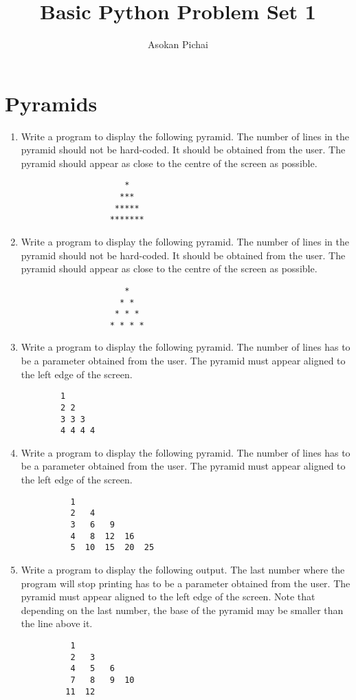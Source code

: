 \documentclass[11pt]{article}
\title{Basic Python Problem Set 1}
\author{Asokan Pichai}
\date{}
\begin{document}
\maketitle
\section{Pyramids}
\begin{enumerate}
    \item Write a program to display the following pyramid. The number of lines in the pyramid should not be hard-coded.
        It should be obtained from the user.  The pyramid should appear as close to the centre of the screen as possible.
        \begin{verbatim}
                     *
                    ***
                   *****
                  *******
        \end{verbatim}
    \item Write a program to display the following pyramid. The number of lines in the pyramid should not be hard-coded.
        It should be obtained from the user.  The pyramid should appear as close to the centre of the screen as possible.
        \begin{verbatim}
                     *
                    * *
                   * * *
                  * * * *
        \end{verbatim}
    \item Write a program to display the following pyramid. The number of lines has to be a parameter obtained from the
        user. The pyramid must appear aligned to the left edge of the screen.
        \begin{verbatim}
        1
        2 2
        3 3 3
        4 4 4 4
        \end{verbatim}
    \item Write a program to display the following pyramid. The number of lines has to be a parameter obtained from the
        user. The pyramid must appear aligned to the left edge of the screen.
        \begin{verbatim}
          1
          2   4
          3   6   9
          4   8  12  16
          5  10  15  20  25
        \end{verbatim}
    \item Write a program to display the following output. The last number where the program will stop printing has to
        be a parameter obtained from the user. The pyramid must appear aligned to the left edge of the screen. Note that
        depending on the last number, the base of the pyramid may be smaller than the line above it.
        \begin{verbatim}
          1
          2   3
          4   5   6
          7   8   9  10
         11  12  
        \end{verbatim}
\end{enumerate}
\end{document}

